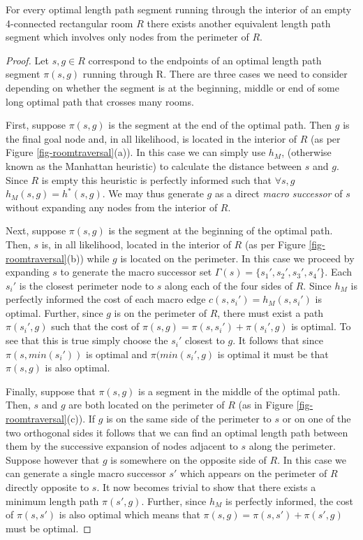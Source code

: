 \begin{mylemma}
\label{thm-roomtraversal}
For every optimal length path segment running through the interior of an empty 
4-connected rectangular room $R$ there exists another equivalent length path 
segment which involves only nodes from the perimeter of $R$.
\end{mylemma}
\begin{proof}
Let $s, g \in R$ correspond to the endpoints of an optimal length path segment 
$\pi(s, g)$ running through R.
There are three cases we need to consider depending on whether the segment 
is at the beginning, middle or end of some long optimal path that crosses
many rooms.
\par
First, suppose $\pi(s, g)$ is the segment at the end of the optimal path.
Then $g$ is the final goal node and, in all likelihood, is located in the 
interior of $R$ (as per Figure \ref{fig-roomtraversal}(a)).
In this case we can simply use $h_{M}$, (otherwise known as the Manhattan heuristic) 
to calculate the distance between $s$ and $g$.
Since $R$ is empty this heuristic is perfectly informed such that 
$\forall s, g$ $h_{M}(s, g) = h^*(s, g)$.
We may thus generate $g$ as a direct \emph{macro successor} of $s$ without expanding 
any nodes from the interior of $R$.
\par
Next, suppose $\pi(s, g)$ is the segment at the beginning of the optimal path. 
Then, $s$ is, in all likelihood, located in the interior of $R$ 
(as per Figure \ref{fig-roomtraversal}(b)) while $g$ is located on the perimeter.
In this case we proceed by expanding $s$ to generate the macro successor set 
$\Gamma(s) = \lbrace s_{1}', s_{2}', s_{3}', s_{4}'\rbrace$.
Each $s_{i}'$ is the closest perimeter node to $s$ along each of the four sides of $R$.
Since $h_{M}$ is perfectly informed the cost of each macro edge 
$c(s, s_{i}') = h_{M}(s, s_{i}')$ is optimal.
Further, since $g$ is on the perimeter of $R$, there must exist a path $\pi(s_{i}', g)$ 
such that the cost of $\pi(s, g) = \pi(s, s_{i}') + \pi(s_{i}', g)$ is optimal.
To see that this is true simply choose the $s_{i}'$ closest to $g$.
It follows that since $\pi(s, min(s_{i}'))$ is optimal and $\pi(min(s_{i}', g)$
is optimal it must be that $\pi(s, g)$ is also optimal. 
\par
Finally, suppose that $\pi(s, g)$ is a segment in the middle of the optimal path.
Then, $s$ and $g$ are both located on the perimeter of $R$ 
(as in Figure \ref{fig-roomtraversal}(c)). 
If $g$ is on the same side of the perimeter to $s$ or on one of the two orthogonal sides 
it follows that we can find an optimal length path between them by the successive expansion of 
nodes adjacent to $s$ along the perimeter.
Suppose however that $g$ is somewhere on the opposite side of $R$.
In this case we can generate a single macro successor $s'$ which appears on the 
perimeter of $R$ directly opposite to $s$.
It now becomes trivial to show that there exists a minimum length path $\pi(s',g)$.
Further, since $h_{M}$ is perfectly informed, the cost of $\pi(s, s')$ is also optimal
which means that $\pi(s, g) = \pi(s, s') + \pi(s', g)$ must be optimal.
\end{proof}

